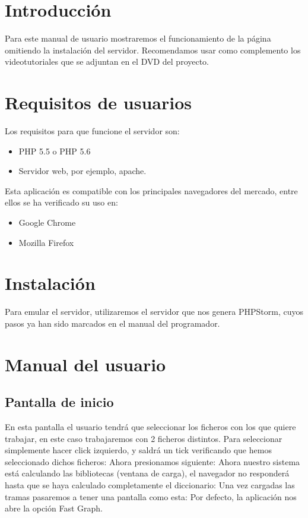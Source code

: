 
\section{Introducción}
Para este manual de usuario mostraremos el funcionamiento de la página omitiendo la instalación del servidor.
Recomendamos usar como complemento los videotutoriales que se adjuntan en el DVD del proyecto.
\section{Requisitos de usuarios}
Los requisitos para que funcione el servidor son:
\begin{itemize}
	\item PHP 5.5 \cite{PHP5.5} o PHP 5.6
	\item Servidor web, por ejemplo, apache.
\end{itemize}
Esta aplicación es compatible con los principales navegadores del mercado, entre ellos se ha verificado su uso en:
\begin{itemize}
	\item Google Chrome
	\item Mozilla Firefox
\end{itemize}

\section{Instalación}
Para emular el servidor, utilizaremos el servidor que nos genera PHPStorm, cuyos pasos ya han sido marcados en el manual del programador.
\section{Manual del usuario}

\subsection{Pantalla de inicio}
En esta pantalla el usuario tendrá que seleccionar los ficheros con los que quiere trabajar, en este caso trabajaremos con 2 ficheros distintos. Para seleccionar simplemente hacer click izquierdo, y saldrá un tick verificando que hemos seleccionado dichos ficheros:
Ahora presionamos siguiente:
Ahora nuestro sistema está calculando las bibliotecas (ventana de carga), el navegador no responderá hasta que se haya calculado completamente el diccionario:
Una vez cargadas las tramas pasaremos a tener una pantalla como esta:
Por defecto, la aplicación nos abre la opción Fast Graph.

